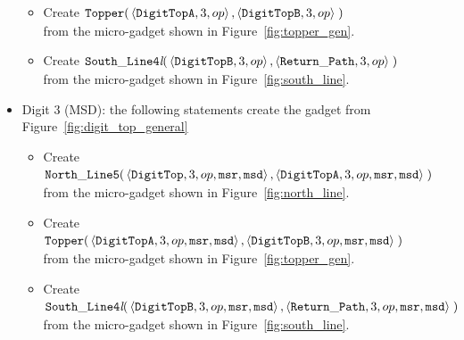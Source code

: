 \begin{itemize}
\begin{itemize}
            \item Create
            $\begin{aligned}[t]
                {\tt Topper}(& \left\langle {\tt DigitTopA}, 3, op  \right\rangle,
                               \left\langle {\tt DigitTopB}, 3, op  \right\rangle \;)
            \end{aligned}$\\from the micro-gadget shown in Figure~\ref{fig:topper_gen}.

            \item Create
            $\begin{aligned}[t]
                {\tt South\_Line4\textit{l}}(& \left\langle {\tt DigitTopB}, 3, op \right\rangle,
                                               \left\langle {\tt Return\_Path},     3, op \right\rangle \;)
            \end{aligned}$\\from the micro-gadget shown in Figure~\ref{fig:south_line}.
        \end{itemize}
        \vspace{1cm}


        \item Digit 3 (MSD): the following statements create the gadget from Figure~\ref{fig:digit_top_general}
        \begin{itemize}
            \item Create
            $\begin{aligned}[t]
                {\tt North\_Line5}(& \left\langle {\tt DigitTop},  3, op, {\tt msr}, {\tt msd}\right\rangle,
                                     \left\langle {\tt DigitTopA}, 3, op, {\tt msr}, {\tt msd}\right\rangle \;)
            \end{aligned}$\\from the micro-gadget shown in Figure~\ref{fig:north_line}.

            \item Create
            $\begin{aligned}[t]
                {\tt Topper}(& \left\langle {\tt DigitTopA}, 3, op, {\tt msr}, {\tt msd}\right\rangle,
                               \left\langle {\tt DigitTopB}, 3, op, {\tt msr}, {\tt msd}\right\rangle \;)
            \end{aligned}$\\ from the micro-gadget shown in Figure~\ref{fig:topper_gen}.


            \item Create
            $\begin{aligned}[t]
                {\tt South\_Line4\textit{l}}(& \left\langle {\tt DigitTopB}, 3, op, {\tt msr}, {\tt msd}\right\rangle,
                                               \left\langle {\tt Return\_Path},     3, op, {\tt msr}, {\tt msd}\right\rangle \;)
            \end{aligned}$\\ from the micro-gadget shown in Figure~\ref{fig:south_line}.
        \end{itemize}

    \end{itemize}

